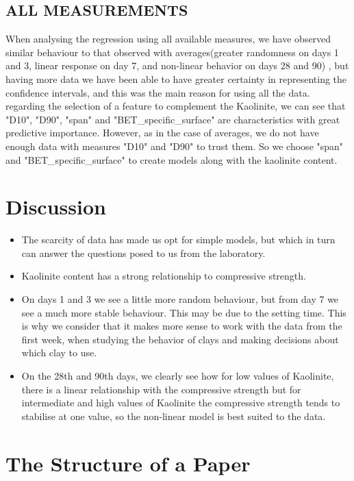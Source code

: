 \documentclass[10pt,conference,compsocconf]{IEEEtran}
\begin{document}
\subsection{ALL MEASUREMENTS}
When analysing the regression using all available measures, we have observed similar behaviour to that observed with averages(greater randomness on days 1 and 3, linear response on day 7, and non-linear behavior on days 28 and 90) , but having more data we have been able to have greater certainty in representing the confidence intervals, and this was the main reason for using all the data.
regarding the selection of a feature to complement the Kaolinite, we can see that "D10", "D90", "span" and "BET\_specific\_surface" are characteristics with great predictive importance. However, as in the case of averages, we do not have enough data with measures "D10" and "D90" to trust them. So we choose "span" and "BET\_specific\_surface" to create models along with the kaolinite content.
\section{Discussion}
\begin{itemize}
\item The scarcity of data has made us opt for simple models, but which in turn can answer the questions posed to us from the laboratory.

\item Kaolinite content has a strong relationship to compressive strength.
\item On days 1 and 3 we see a little more random behaviour, but from day 7 we see a much more stable behaviour. This may be due to the setting time. This is why we consider that it makes more sense to work with the data from the first week, when studying the behavior of clays and making decisions about which clay to use.
\item On the 28th and 90th days, we clearly see how for low values of Kaolinite, there is a linear relationship with the compressive strength but for intermediate and high values of Kaolinite the compressive strength tends to stabilise at one value, so the non-linear model is best suited to the data.

\end{itemize}
\section{The Structure of a Paper}
\label{sec:structure-paper}
\end{document}
